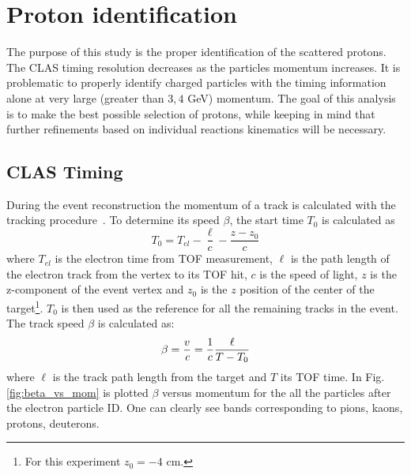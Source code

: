 \section{Proton identification}\label{sec:proton-identification}

The purpose of this study is the proper identification of the
scattered protons.
The CLAS timing resolution decreases as the particles momentum increases.
It is problematic to properly identify
charged particles with the timing information alone at very large (greater than $3, 4$ GeV) momentum.
The goal of this analysis is to make the best possible selection of protons, while keeping
in mind that further refinements based on individual reactions kinematics will be necessary.

\subsection{CLAS Timing}
\label{sec:clas_timing}
During the event reconstruction the momentum of a track is calculated
with the tracking procedure~\cite{bib:tracking}.
To determine its speed $\beta$, the start time $T_0$ is calculated as
\begin{equation}
    T_0 = T_{el} - \frac{\ell}{c} - \frac{z-z_0}{c}\label{eq:time_diff}
\end{equation}
where $T_{el}$ is the electron time from TOF measurement, $\ell$ is the
path length of the electron track from the vertex to its TOF hit, $c$ is
the speed of light, $z$ is the z-component of the event vertex and $z_0$
is the $z$ position of the center of the
target\footnote{For this experiment $z_0 = -4$ cm.}. $T_0$ is then used
as the reference for all the remaining tracks in the event.
The track speed $\beta$ is calculated as:
\begin{equation}
    \beta = \frac{v}{\textit c} = \frac{1}{c} \frac{\ell}{T-T_0}\label{eq:timing}
\end{equation}
where $\ell$ is the track path length from the target and $T$ its TOF time.
In Fig.\ref{fig:beta_vs_mom} is plotted $\beta$ versus momentum for the all the
particles after the electron particle ID. One can clearly see bands corresponding
to pions, kaons, protons, deuterons.

